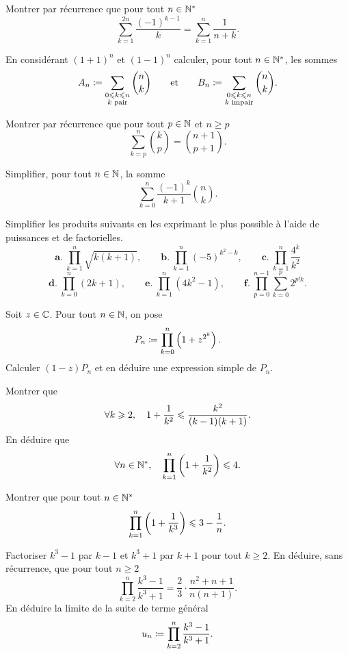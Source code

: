 \documentclass{magnolia}
\begin{document}
Montrer par récurrence que pour tout $n\in{\mathbb{N}^*}$
\[\sum_{k=1}^{2n} \frac{(-1)^{k-1}}{k}=\sum_{k=1}^n \frac{1}{n+k}.\]

En considérant $(1+1)^n$ et $(1-1)^n$ calculer, pour tout $n\in{\mathbb{N}^*}$, les sommes
\[A_n\coloneqq \sum_{\substack{0\leqslant k\leqslant n\\\text{$k$ pair}}} \binom{n}{k}
  \qquad\text{et}\qquad
  B_n\coloneqq \sum_{\substack{0\leqslant k\leqslant n\\\text{$k$ impair}}} \binom{n}{k}.\]

Montrer par récurrence que pour tout $p\in\mathbb{N}$ et $n\geq p$
\[\sum_{k=p}^n \binom{k}{p}=\binom{n+1}{p+1}.\]

Simplifier, pour tout $n\in\mathbb{N}$, la somme
\[\sum_{k=0}^n \frac{(-1)^k}{k+1}\binom{n}{k}.\]


Simplifier les produits suivants en les exprimant le plus possible à l'aide
de puissances et de factorielles.
\[\textbf{a.}\ \prod_{k=1}^n \sqrt{k(k+1)},\qquad
  \textbf{b.}\ \prod_{k=1}^n (-5)^{k^2-k},\qquad
  \textbf{c.}\ \prod_{k=1}^n \frac{4^k}{k^2}\]
\[\textbf{d.}\ \prod_{k=0}^n (2k+1),\qquad
  \textbf{e.}\ \prod_{k=1}^n (4k^2-1),\qquad
  \textbf{f.}\ \prod_{p=0}^{n-1} \sum_{k=0}^p 2^{p! k}.\]

Soit $z\in\mathbb{C}$. Pour tout $n\in\mathbb{N}$, on pose
\[P_n\coloneqq \prod_{k=0}^n \left(1+z^{2^k}\right).\]
Calculer $(1-z)P_n$ et en déduire une expression simple de $P_n$.

\begin{questions}
\question
\begin{questions}
\question Montrer que
  \[\forall k\geqslant 2,\quad 1+\frac{1}{k^2} \leqslant \frac{k^2}{(k-1)(k+1)}.\]
\question En déduire que
  \[\forall n\in{\mathbb{N}^*},\quad \prod_{k=1}^n \left(1+\frac{1}{k^2}\right)\leqslant 4.\]
\end{questions}
\question Montrer que pour tout $n\in{\mathbb{N}^*}$
  \[\prod_{k=1}^n \left(1+\frac{1}{k^3}\right)\leqslant 3-\frac{1}{n}.\]
\end{questions}

\begin{questions}
\question Factoriser $k^3-1$ par $k-1$ et $k^3+1$ par $k+1$ pour tout $k\geq 2$.
\question En déduire, sans récurrence, que pour tout $n\geq 2$
  \[\prod_{k=2}^n \frac{k^3-1}{k^3+1}=\frac{2}{3}\cdot\frac{n^2+n+1}{n(n+1)}.\]
\question En déduire la limite de la suite de terme général
  \[u_n\coloneqq \prod_{k=2}^n \frac{k^3-1}{k^3+1}.\] 
\end{questions}
\end{document}
